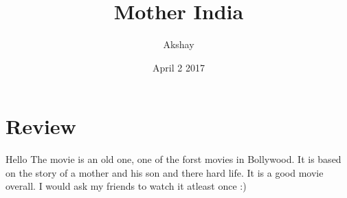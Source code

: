 \documentclass{article}
\title{Mother India}
\author{Akshay}
\date{April 2 2017}
\begin{document}
\maketitle
\section{Review}
Hello
The movie is an old one, one of the forst movies in Bollywood. It is based on the story of a mother and his son and there hard life. It is a good movie overall.
I would ask my friends to watch it atleast once :)
\end{document}
